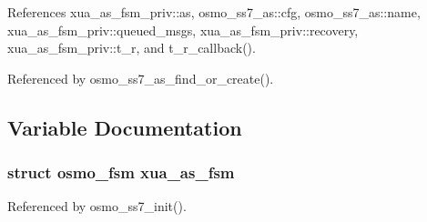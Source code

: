 References xua\+\_\+as\+\_\+fsm\+\_\+priv\+::as, osmo\+\_\+ss7\+\_\+as\+::cfg, osmo\+\_\+ss7\+\_\+as\+::name, xua\+\_\+as\+\_\+fsm\+\_\+priv\+::queued\+\_\+msgs, xua\+\_\+as\+\_\+fsm\+\_\+priv\+::recovery, xua\+\_\+as\+\_\+fsm\+\_\+priv\+::t\+\_\+r, and t\+\_\+r\+\_\+callback().



Referenced by osmo\+\_\+ss7\+\_\+as\+\_\+find\+\_\+or\+\_\+create().



\subsection{Variable Documentation}
\subsubsection[{xua\+\_\+as\+\_\+fsm}]{\setlength{\rightskip}{0pt plus 5cm}struct osmo\+\_\+fsm xua\+\_\+as\+\_\+fsm}\label{xua__as__fsm_8h_a4dda03cd65066f53f8b4b31af8fb24b6}


Referenced by osmo\+\_\+ss7\+\_\+init().

